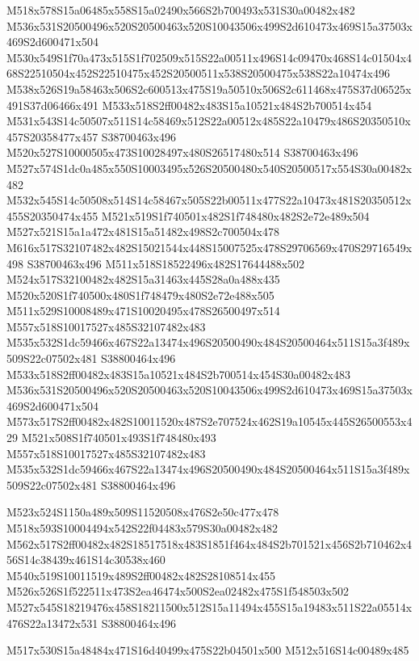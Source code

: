 \documentclass{article}
\begin{document}
\begin{multicols}{2}
M518x578S15a06485x558S15a02490x566S2b700493x531S30a00482x482 M536x531S20500496x520S20500463x520S10043506x499S2d610473x469S15a37503x469S2d600471x504 M530x549S1f70a473x515S1f702509x515S22a00511x496S14c09470x468S14c01504x468S22510504x452S22510475x452S20500511x538S20500475x538S22a10474x496 M538x526S19a58463x506S2c600513x475S19a50510x506S2c611468x475S37d06525x491S37d06466x491 M533x518S2ff00482x483S15a10521x484S2b700514x454 M531x543S14c50507x511S14c58469x512S22a00512x485S22a10479x486S20350510x457S20358477x457 S38700463x496 M520x527S10000505x473S10028497x480S26517480x514 S38700463x496 M527x574S1dc0a485x550S10003495x526S20500480x540S20500517x554S30a00482x482 M532x545S14c50508x514S14c58467x505S22b00511x477S22a10473x481S20350512x455S20350474x455 M521x519S1f740501x482S1f748480x482S2e72e489x504 M527x521S15a1a472x481S15a51482x498S2c700504x478 M616x517S32107482x482S15021544x448S15007525x478S29706569x470S29716549x498 S38700463x496 M511x518S18522496x482S17644488x502 M524x517S32100482x482S15a31463x445S28a0a488x435 M520x520S1f740500x480S1f748479x480S2e72e488x505 M511x529S10008489x471S10020495x478S26500497x514 M557x518S10017527x485S32107482x483 M535x532S1dc59466x467S22a13474x496S20500490x484S20500464x511S15a3f489x509S22c07502x481 S38800464x496 M533x518S2ff00482x483S15a10521x484S2b700514x454S30a00482x483 M536x531S20500496x520S20500463x520S10043506x499S2d610473x469S15a37503x469S2d600471x504 M573x517S2ff00482x482S10011520x487S2e707524x462S19a10545x445S26500553x429 M521x508S1f740501x493S1f748480x493 M557x518S10017527x485S32107482x483 M535x532S1dc59466x467S22a13474x496S20500490x484S20500464x511S15a3f489x509S22c07502x481 S38800464x496

M523x524S1150a489x509S11520508x476S2e50c477x478 M518x593S10004494x542S22f04483x579S30a00482x482 M562x517S2ff00482x482S18517518x483S1851f464x484S2b701521x456S2b710462x456S14c38439x461S14c30538x460 M540x519S10011519x489S2ff00482x482S28108514x455 M526x526S1f522511x473S2ea46474x500S2ea02482x475S1f548503x502 M527x545S18219476x458S18211500x512S15a11494x455S15a19483x511S22a05514x476S22a13472x531 S38800464x496

\begin{center}
M517x530S15a48484x471S16d40499x475S22b04501x500 M512x516S14c00489x485 
\end{center}




\end{multicols}
\end{document}
